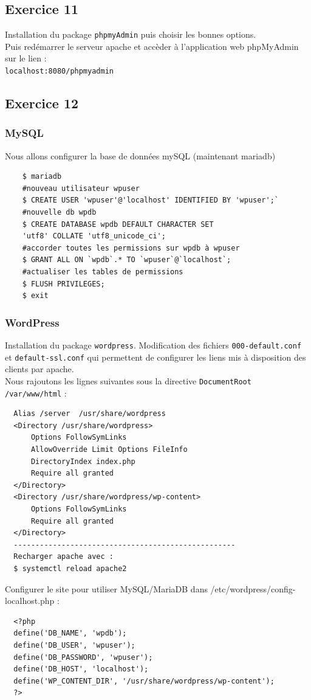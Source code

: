 \documentclass{report}
\begin{document}
\subsection{Exercice 11}
Installation du package \texttt{phpmyAdmin} puis choisir les bonnes options.\\
Puis redémarrer le serveur apache et accèder à l'application web phpMyAdmin sur le lien : \\
\texttt{localhost:8080/phpmyadmin}

\subsection{Exercice 12}
\subsubsection{MySQL}
Nous allons configurer la base de données mySQL (maintenant mariadb)
\begin{tcolorbox}
  \begin{verbatim}
    $ mariadb
    #nouveau utilisateur wpuser
    $ CREATE USER 'wpuser'@'localhost' IDENTIFIED BY 'wpuser';`
    #nouvelle db wpdb
    $ CREATE DATABASE wpdb DEFAULT CHARACTER SET
    'utf8' COLLATE 'utf8_unicode_ci';
    #accorder toutes les permissions sur wpdb à wpuser
    $ GRANT ALL ON `wpdb`.* TO `wpuser`@`localhost`;
    #actualiser les tables de permissions
    $ FLUSH PRIVILEGES;
    $ exit
  \end{verbatim}
\end{tcolorbox}
\subsubsection{WordPress}
Installation du package \texttt{wordpress}.
Modification des fichiers \texttt{000-default.conf} et \texttt{default-ssl.conf} qui permettent
de configurer les liens mis à disposition des clients par apache.\\
Nous rajoutons les lignes suivantes sous la directive \texttt{DocumentRoot /var/www/html} :
\begin{tcolorbox}
  \begin{verbatim}
  Alias /server  /usr/share/wordpress
  <Directory /usr/share/wordpress>
      Options FollowSymLinks
      AllowOverride Limit Options FileInfo
      DirectoryIndex index.php
      Require all granted
  </Directory>
  <Directory /usr/share/wordpress/wp-content>
      Options FollowSymLinks
      Require all granted
  </Directory>
  ---------------------------------------------------
  Recharger apache avec :
  $ systemctl reload apache2
  \end{verbatim}
\end{tcolorbox}
Configurer le site pour utiliser MySQL/MariaDB dans /etc/wordpress/config-localhost.php :
\begin{tcolorbox}
  \begin{verbatim}
  <?php
  define('DB_NAME', 'wpdb');
  define('DB_USER', 'wpuser');
  define('DB_PASSWORD', 'wpuser');
  define('DB_HOST', 'localhost');
  define('WP_CONTENT_DIR', '/usr/share/wordpress/wp-content');
  ?>
  \end{verbatim}
\end{tcolorbox}
\end{document}
